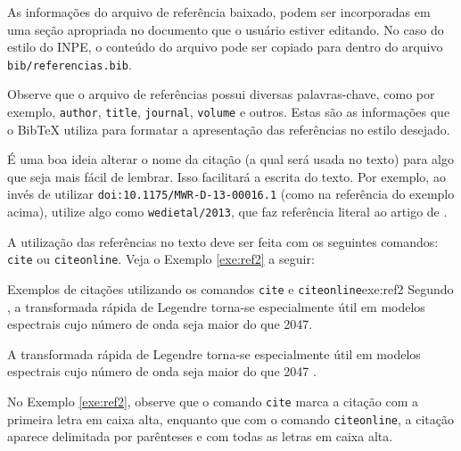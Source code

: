 As informações do arquivo de referência baixado, podem ser incorporadas em uma seção apropriada no documento que o usuário estiver editando. No caso do estilo do INPE, o conteúdo do arquivo pode ser copiado para dentro do arquivo {\tt bib/referencias.bib}.

Observe que o arquivo de referências possui diversas palavras-chave, como por exemplo, {\tt author}, {\tt title}, {\tt journal}, {\tt volume} e outros. Estas são as informações que o BibTeX utiliza para formatar a apresentação das referências no estilo desejado.

\begin{marker}
  É uma boa ideia alterar o nome da citação (a qual será usada no texto) para algo que seja mais fácil de lembrar. Isso facilitará a escrita do texto. Por exemplo, ao invés de utilizar {\tt doi:10.1175/MWR-D-13-00016.1} (como na referência do exemplo acima), utilize algo como {\tt wedietal/2013}, que faz referência literal ao artigo de .
\end{marker}

A utilização das referências no texto deve ser feita com os seguintes comandos: {\tt cite} ou {\tt citeonline}. Veja o Exemplo \ref{exe:ref2} a seguir:

\begin{texexptitled}[breakable,center lower,enhanced,middle=2mm]{Exemplos de citações utilizando os comandos {\tt cite} e {\tt citeonline}}{exe:ref2}
Segundo , a transformada rápida de Legendre torna-se especialmente útil em modelos espectrais cujo número de onda seja maior do que 2047.

A transformada rápida de Legendre torna-se especialmente útil em modelos espectrais cujo número de onda seja maior do que 2047 \cite{wedietal/2013}.
\end{texexptitled}

No Exemplo \ref{exe:ref2}, observe que o comando {\tt cite} marca a citação com a primeira letra em caixa alta, enquanto que com o comando {\tt citeonline}, a citação aparece delimitada por parênteses e com todas as letras em caixa alta. 


%
%
%
%
%
%
%
%


